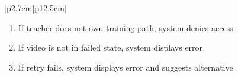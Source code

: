 \begin{table}[H]
\begin{tabular}{|p{2.7cm}|p{12.5cm}|}
\begin{minipage}[t]{\linewidth}
\begin{enumerate}[topsep=0pt,itemsep=1pt,parsep=0pt,partopsep=0pt]
                                          \item If teacher does not own training path, system denies access
                                          \item If video is not in failed state, system displays error
                                          \item If retry fails, system displays error and suggests alternative
                                      \end{enumerate}
                                  \end{minipage} \\
        \hline
    \end{tabular}
    \label{tab:teacher-retry-video}
\end{table}
